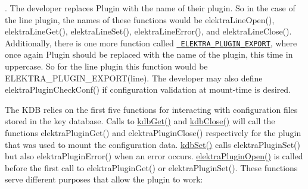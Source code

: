 . The developer replaces {\ttfamily Plugin} with the name of their plugin. So in the case of the line plugin, the names of these functions would be {\ttfamily elektra\+Line\+Open()}, {\ttfamily elektra\+Line\+Get()}, {\ttfamily elektra\+Line\+Set()}, {\ttfamily elektra\+Line\+Error()}, and {\ttfamily elektra\+Line\+Close()}. Additionally, there is one more function called \href{https://doc.libelektra.org/api/current/html/group__plugin.html\#ga8dd092048e972a3f0c9c9f54eb41576e}{\texttt{ E\+L\+E\+K\+T\+R\+A\+\_\+\+P\+L\+U\+G\+I\+N\+\_\+\+E\+X\+P\+O\+RT}}, where once again {\ttfamily Plugin} should be replaced with the name of the plugin, this time in uppercase. So for the line plugin this function would be {\ttfamily E\+L\+E\+K\+T\+R\+A\+\_\+\+P\+L\+U\+G\+I\+N\+\_\+\+E\+X\+P\+O\+R\+T(line)}. The developer may also define {\ttfamily elektra\+Plugin\+Check\+Conf()} if configuration validation at mount-\/time is desired.

The K\+DB relies on the first five functions for interacting with configuration files stored in the key database. Calls to {\ttfamily \mbox{\hyperlink{group__kdb_ga28e385fd9cb7ccfe0b2f1ed2f62453a1}{kdb\+Get()}}} and {\ttfamily \mbox{\hyperlink{group__kdb_gadb54dc9fda17ee07deb9444df745c96f}{kdb\+Close()}}} will call the functions {\ttfamily elektra\+Plugin\+Get()} and {\ttfamily elektra\+Plugin\+Close()} respectively for the plugin that was used to mount the configuration data. {\ttfamily \mbox{\hyperlink{group__kdb_ga11436b058408f83d303ca5e996832bcf}{kdb\+Set()}}} calls {\ttfamily elektra\+Plugin\+Set()} but also {\ttfamily elektra\+Plugin\+Error()} when an error occurs. {\ttfamily \mbox{\hyperlink{elektra_2plugin_8c_a32a70a7876542c51d153164ac5108a57}{elektra\+Plugin\+Open()}}} is called before the first call to {\ttfamily elektra\+Plugin\+Get()} or {\ttfamily elektra\+Plugin\+Set()}. These functions serve different purposes that allow the plugin to work\+:



